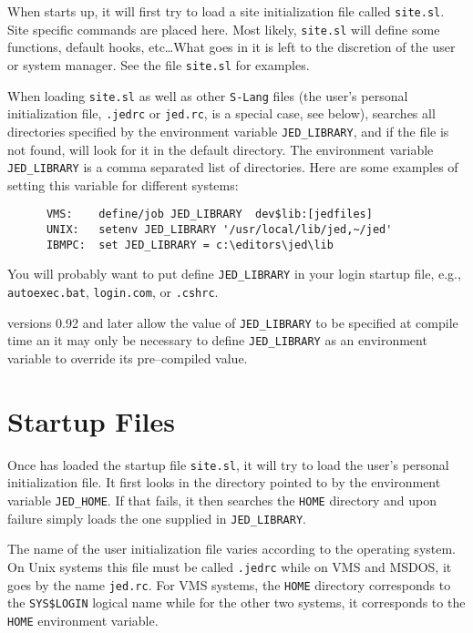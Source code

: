   When \jed{} starts up, it will first try to load a site initialization file
  called \verb|site.sl|.  Site specific commands are placed here.  Most
  likely, \verb|site.sl| will define some functions, default hooks,
  etc\ldots  What goes in it is left to the discretion of the user or system
  manager. See the file \verb|site.sl| for examples.

  When loading \verb|site.sl| as well as other \verb|S-Lang| files (the
  user's personal initialization file, \verb|.jedrc| or \verb|jed.rc|, is a
  special case, see below), \jed{} searches all directories specified by the
  environment variable \verb|JED_LIBRARY|, and if the file is not found, \jed{}
  will look for it in the default directory. The environment variable
  \verb|JED_LIBRARY| is a comma separated list of directories.  Here are
  some examples of setting this variable for different systems:

\begin{verbatim}
      VMS:    define/job JED_LIBRARY  dev$lib:[jedfiles]
      UNIX:   setenv JED_LIBRARY '/usr/local/lib/jed,~/jed'
      IBMPC:  set JED_LIBRARY = c:\editors\jed\lib
\end{verbatim}


  You will probably want to put define \verb|JED_LIBRARY| in your login
  startup file, e.g., \verb|autoexec.bat|, \verb|login.com|, or
  \verb|.cshrc|.

  \jed{} versions 0.92 and later allow the value of \verb|JED_LIBRARY| to be
  specified at compile time an it may only be necessary to define
  \verb|JED_LIBRARY| as an environment variable to override its
  pre--compiled value.

\section{Startup Files}

  Once \jed{} has loaded the startup file \verb|site.sl|, it will try to load
  the user's personal initialization file.  It first looks in the directory
  pointed to by the environment variable \verb|JED_HOME|. If that fails, it
  then searches the \verb|HOME| directory and upon failure simply loads the
  one supplied in \verb|JED_LIBRARY|.

  The name of the user initialization file varies according to the operating
  system.  On Unix systems this file must be called \verb|.jedrc| while on
  VMS and MSDOS, it goes by the name \verb|jed.rc|.  For VMS systems, the
  \verb|HOME| directory corresponds to the \verb|SYS$LOGIN| logical name
  while for the other two systems, it corresponds to the \verb|HOME|
  environment variable.

